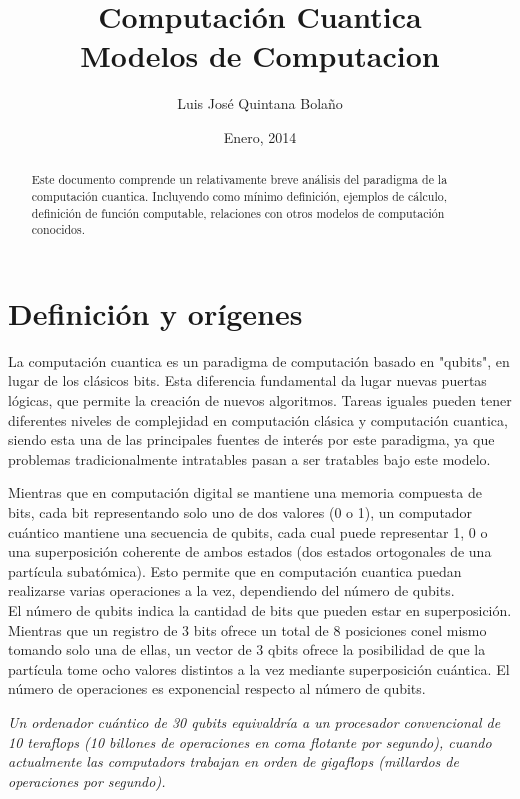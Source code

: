 \documentclass[a4paper]{article}
\title{Computación Cuantica \\ Modelos de Computacion}
\author{Luis José Quintana Bolaño}
\date{Enero, 2014}
\begin{document}
	\maketitle
	\begin{abstract}
	    Este documento comprende un relativamente breve análisis del paradigma de la computación cuantica. Incluyendo como mínimo definición, ejemplos de cálculo, definición de función computable, relaciones con otros modelos de computación conocidos.
  	\end{abstract}
  	
  	\section{Definición y orígenes}
  		La computación cuantica es un paradigma de computación basado en "qubits", en lugar de los clásicos bits. Esta diferencia fundamental da lugar nuevas puertas lógicas, que permite la creación de nuevos algoritmos. Tareas iguales pueden tener diferentes niveles de complejidad en computación clásica y computación cuantica, siendo esta una de las principales fuentes de interés por este paradigma, ya que problemas tradicionalmente intratables pasan a ser tratables bajo este modelo.
  		
  		Mientras que en computación digital se mantiene una memoria compuesta de bits, cada bit representando solo uno de dos valores (0 o 1), un computador cuántico mantiene una secuencia de qubits, cada cual puede representar 1, 0 o una superposición coherente de ambos estados (dos estados ortogonales de una partícula subatómica). Esto permite que en computación cuantica puedan realizarse varias operaciones a la vez, dependiendo del número de qubits.\\
  		El número de qubits indica la cantidad de bits que pueden estar en superposición. Mientras que un registro de 3 bits ofrece un total de 8 posiciones conel mismo tomando solo una de ellas, un vector de 3 qbits ofrece la posibilidad de que la partícula tome ocho valores distintos a la vez mediante superposición cuántica. El número de operaciones es exponencial respecto al número de qubits.
  		
		\begin{center}\emph{Un ordenador cuántico de 30 qubits equivaldría a un procesador convencional de 10 teraflops (10 billones de operaciones en coma flotante por segundo), cuando actualmente las computadors trabajan en orden de gigaflops (millardos de operaciones por segundo). }\end{center}
		
\end{document}
